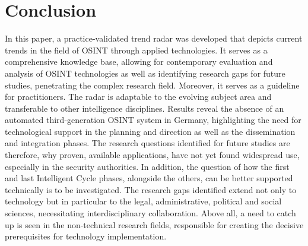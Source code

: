 \documentclass[10pt]{article}
\newcommand{\sansserifformat}[1]{\fontfamily{cmss}{ #1}}%
\begin{document}
{\section{Conclusion}

In this paper, a practice-validated trend radar was developed that depicts current trends
in the field of OSINT through applied technologies. It serves as a comprehensive knowledge base,
allowing for contemporary evaluation and analysis of OSINT technologies as well as identifying research
gaps for future studies, penetrating the complex research field. Moreover, it serves as a guideline for practitioners. The radar
is adaptable to the evolving subject area and transferable to other intelligence disciplines.
Results reveal the absence of an automated third-generation OSINT system in Germany, highlighting the
need for technological support in the planning and direction as well as the dissemination and integration phases.
The research questions identified for future studies are therefore, why proven, available applications,
have not yet found widespread use, especially in the security authorities.
In addition, the question of how the first and last Intelligent Cycle phases, alongside the others,
can be better supported technically is to be investigated. The research gaps identified extend
not only to technology but in particular to the legal, administrative, political and
social sciences, necessitating interdisciplinary collaboration. Above all, a need to catch up is seen
in the non-technical research fields, responsible for creating the decisive prerequisites for technology
implementation.







}
\end{document}
